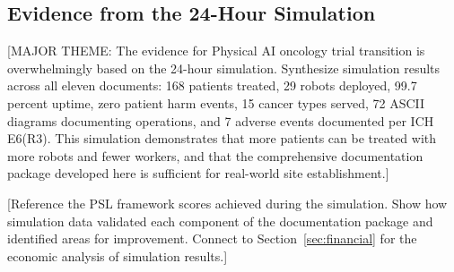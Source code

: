 \subsection{Evidence from the 24-Hour Simulation}
\label{subsec:site-simulation}

[MAJOR THEME: The evidence for Physical AI oncology trial transition is
overwhelmingly based on the 24-hour simulation. Synthesize simulation results
across all eleven documents: 168 patients treated, 29 robots deployed, 99.7
percent uptime, zero patient harm events, 15 cancer types served, 72 ASCII
diagrams documenting operations, and 7 adverse events documented per ICH
E6(R3). This simulation demonstrates that more patients can be treated with
more robots and fewer workers, and that the comprehensive documentation
package developed here is sufficient for real-world site establishment.]

[Reference the PSL framework scores achieved during the simulation. Show how
simulation data validated each component of the documentation package and
identified areas for improvement. Connect to Section~\ref{sec:financial} for
the economic analysis of simulation results.]
